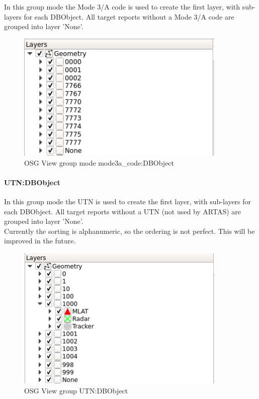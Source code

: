 In this group mode the Mode 3/A code is used to create the first layer, with sub-layers for each DBObject. All target reports without a Mode 3/A code are grouped into layer 'None'.

\begin{figure}[H]
    \includegraphics[width=10cm,frame]{../screenshots/osgview_group_ma_dbo.png}
  \caption{OSG View group mode mode3a\_code:DBObject}
\end{figure}

\paragraph{UTN:DBObject}

In this group mode the UTN is used to create the first layer, with sub-layers for each DBObject. All target reports without a UTN (not used by ARTAS) are grouped into layer 'None'.  \\

Currently the sorting is alphanumeric, so the ordering is not perfect. This will be improved in the future.

\begin{figure}[H]
    \includegraphics[width=10cm,frame]{../screenshots/osgview_group_utn_dbo.png}
  \caption{OSG View group UTN:DBObject}
\end{figure}

